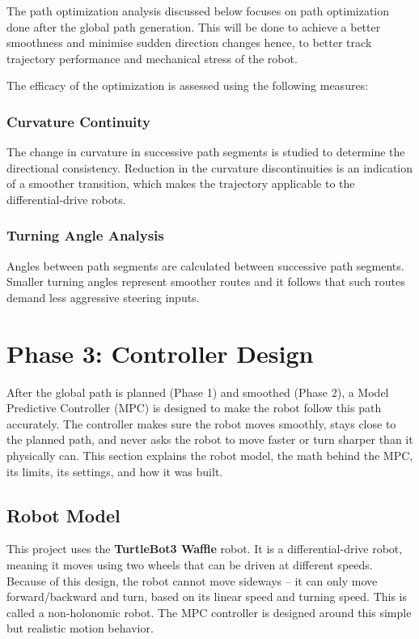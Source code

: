 The path optimization analysis discussed below focuses on path optimization done after the global path generation. This will be done to achieve a better smoothness and minimise sudden direction changes hence, to better track trajectory performance and mechanical stress of the robot.  

The efficacy of the optimization is assessed using the following measures:  

\subsubsection{Curvature Continuity}

The change in curvature in successive path segments is studied to determine the directional consistency. Reduction in the curvature discontinuities is an indication of a smoother transition, which makes the trajectory applicable to the differential-drive robots.  

\subsubsection{Turning Angle Analysis}

Angles between path segments are calculated between successive path segments. Smaller turning angles represent smoother routes and it follows that such routes demand less aggressive steering inputs.  


\section{Phase 3: Controller Design}
\label{sec:phase3_mpc}

After the global path is planned (Phase 1) and smoothed (Phase 2), a Model Predictive Controller (MPC) is designed to make the robot follow this path accurately. The controller makes sure the robot moves smoothly, stays close to the planned path, and never asks the robot to move faster or turn sharper than it physically can. This section explains the robot model, the math behind the MPC, its limits, its settings, and how it was built.

\subsection{Robot Model}
\label{subsec:mpc_robot_model}

This project uses the \textbf{TurtleBot3 Waffle} robot. It is a differential-drive robot, meaning it moves using two wheels that can be driven at different speeds. Because of this design, the robot cannot move sideways -- it can only move forward/backward and turn, based on its linear speed and turning speed. This is called a non-holonomic robot. The MPC controller is designed around this simple but realistic motion behavior.

